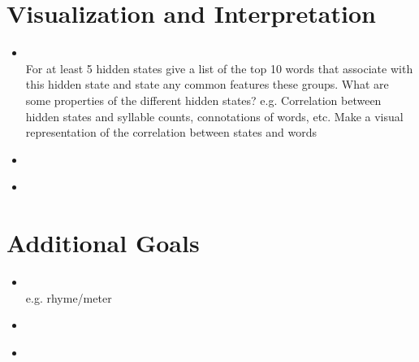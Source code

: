 \section{Visualization and Interpretation}
\medskip
\begin{itemize}


    \item {} \\

        For at least 5 hidden states give a list of the top 10 words that associate with this hidden state and
state any common features these groups.
What are some properties of the different hidden states?
e.g. Correlation between hidden states and syllable counts, connotations of words, etc.
Make a visual representation of the correlation between states and words

    \item {} \\

    \item {} \\

\end{itemize}


\section{Additional Goals}
\medskip
\begin{itemize}


    \item {} \\

        e.g. rhyme/meter

    \item {} \\

    \item {} \\

\end{itemize}



